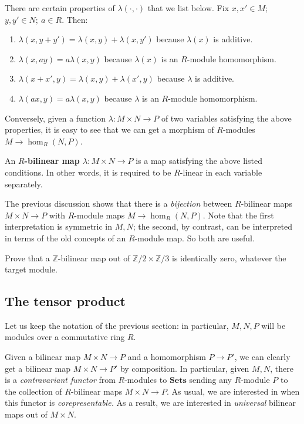 There are
certain properties of $\lambda(\cdot, \cdot)$ that we list below.
Fix $x , x' \in M$; $y, y' \in N; \ a \in R$. Then:
\begin{enumerate}
\item  $\lambda(x,y+y') = \lambda(x,y) + \lambda(x, y')$ because $\lambda(x)$
is
 additive.
\item  $\lambda(x, ay) = a \lambda(x,y)$ because $\lambda(x)$ is an
$R$-module homomorphism.
\item  $\lambda(x+x', y) = \lambda(x,y) + \lambda(x', y)$ because
$\lambda$ is additive.
\item   $\lambda(ax, y) = a\lambda(x,y)$ because $\lambda$ is an $R$-module
homomorphism.
\end{enumerate}

Conversely, given a function $\lambda: M \times N \to P$ of two variables satisfying the above properties,
it is easy to see that we can get a morphism of $R$-modules $M \to
\hom_R(N,P)$.



\begin{definition}
An \textbf{$R$-bilinear map $\lambda: M \times N \to P$} is a map satisfying
the above listed conditions. In other words, it is required to be $R$-linear
in each variable separately.
\end{definition}

The previous discussion shows that there is a \emph{bijection} between $R$-bilinear
maps $M \times N \to P$ with $R$-module maps $M \to \hom_R(N,P)$.
Note that the first interpretation is symmetric in $M,N$; the second, by
contrast, can be interpreted in terms of the old concepts of an $R$-module map.
So both are useful.

\begin{exercise}
Prove that a $\mathbb{Z}$-bilinear map out of $\mathbb{Z}/2 \times
\mathbb{Z}/3$ is identically zero, whatever the target module.
\end{exercise}

\subsection{The tensor product}

Let us keep the notation of the previous section: in particular, $M,N, P$ will
be modules over a commutative ring $R$.

Given a bilinear map $M \times N \to P$ and a homomorphism $P \to P'$, we can
clearly get a bilinear map $M \times N \to P'$ by composition.
In particular, given $M,N$, there is a \emph{contravariant functor} from
$R$-modules to
$\mathbf{Sets}$ sending  any $R$-module $P$ to the collection of $R$-bilinear
maps $M \times N
\to P$. As usual, we are interested in when this functor is
\emph{corepresentable.}
As  a result,
we are interested in \emph{universal} bilinear maps out of $M \times N$.


